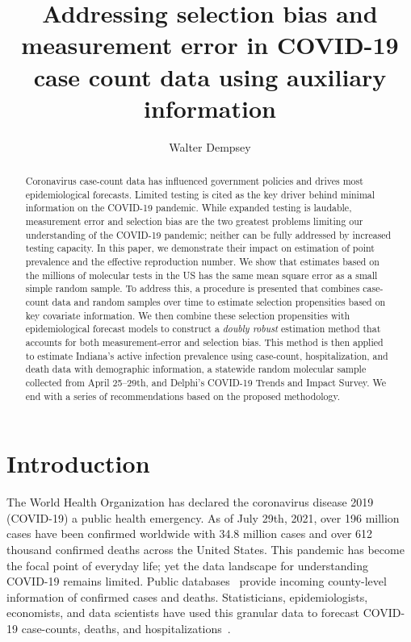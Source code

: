 \documentclass[11pt]{amsart}
\numberwithin{equation}{section}
\theoremstyle{plain}
\begin{document}
\title[Addressing selection bias and measurement error in COVID-19 case counts]{Addressing selection bias and measurement error in COVID-19 case count data using auxiliary information} %

\author{Walter Dempsey}
\address{Department of Biostatistics, University of Michigan, Ann Arbor, MI 48109}

\begin{abstract}
  Coronavirus case-count data has influenced government policies and drives most epidemiological forecasts. Limited testing is cited as the key driver behind minimal information on the COVID-19 pandemic. While expanded testing is laudable, measurement error and selection bias are the two greatest problems limiting our understanding of the COVID-19 pandemic; neither can be fully addressed by increased testing capacity. In this paper, we demonstrate their impact on estimation of point prevalence and the effective reproduction number. We show that estimates based on the millions of molecular tests in the US has the same mean square error as a small simple random sample.  To address this, a procedure is presented that combines case-count data and random samples over time to estimate selection propensities based on key covariate information. We then combine these selection propensities with epidemiological forecast models to construct a \emph{doubly robust} estimation method that accounts for both measurement-error and selection bias.  This method is then applied to estimate Indiana's active infection prevalence using case-count, hospitalization, and death data with demographic information, a statewide random molecular sample collected from April 25--29th, and Delphi's COVID-19 Trends and Impact Survey.  We end with a series of recommendations based on the proposed methodology.
\end{abstract}

\maketitle

\section{Introduction}
The World Health Organization has declared the coronavirus disease 2019 (COVID-19) a public health emergency.  As of July 29th, 2021, over 196 million cases have been confirmed worldwide with 34.8 million cases and over 612 thousand confirmed deaths across the United States. This pandemic
has become the focal point of everyday life; yet the data landscape for understanding COVID-19 remains limited.  Public databases~\citep{JHU_Lancet,NYT} provide incoming county-level information of confirmed cases and deaths.  Statisticians, epidemiologists, economists, and data scientists have used this granular data to forecast COVID-19 case-counts, deaths, and hospitalizations~\citep{Giordano2020,Song2020,Ray2020,2020.IHME,Wang2020.03,JTD36385}.
\end{document}
